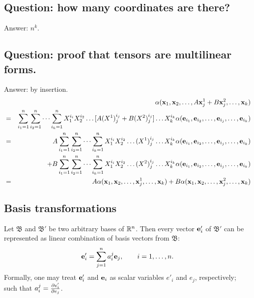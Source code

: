 \subsection*{Question: how many coordinates are there?}
{Answer: $n^k$.}

\subsection*{Question: proof that tensors are multilinear forms.}
{Answer:}
by insertion.
\begin{eqnarray}
&&\alpha ( {\bf x}_1,{\bf x}_2,\ldots , A{\bf x}^1_j+B{\bf x}_j^2,\ldots ,{\bf x}_k)
\nonumber \\
&=&
\sum_{i_1=1}^n
\sum_{i_2=1}^n
\cdots
\sum_{i_k=1}^n
X^{i_i}_1X^{i_2}_2\ldots  [A(X^1)^{i_j}_j+B(X^2)^{i_j}_j]\ldots X^{i_k}_k
\alpha ( {\bf e}_{i_1},{\bf e}_{i_2},\ldots,{\bf e}_{i_j},\ldots ,{\bf e}_{i_k})
\nonumber \\
&=& A
\sum_{i_1=1}^n
\sum_{i_2=1}^n
\cdots
\sum_{i_k=1}^n
X^{i_i}_1X^{i_2}_2\ldots  (X^1)^{i_j}_j\ldots X^{i_k}_k
\alpha ( {\bf e}_{i_1},{\bf e}_{i_2},\ldots,{\bf e}_{i_j},\ldots ,{\bf e}_{i_k})
\nonumber \\
&&\quad +
B
\sum_{i_1=1}^n
\sum_{i_2=1}^n
\cdots
\sum_{i_k=1}^n
X^{i_i}_1X^{i_2}_2\ldots  (X^2)^{i_j}_j\ldots X^{i_k}_k
\alpha ( {\bf e}_{i_1},{\bf e}_{i_2},\ldots,{\bf e}_{i_j},\ldots ,{\bf e}_{i_k})
\nonumber \\
&=& A \alpha ( {\bf x}_1,{\bf x}_2,\ldots , {\bf x}^1_j,\ldots ,{\bf x}_k)+
B \alpha ( {\bf x}_1,{\bf x}_2,\ldots , {\bf x}_j^2,\ldots ,{\bf x}_k)\nonumber
\end{eqnarray}

\subsection{Basis transformations}
Let
${\mathfrak B}$
and
${\mathfrak B'}$
be two arbitrary bases of
${\Bbb R}^n$.
Then every vector ${\bf e}'_i$ of
${\mathfrak B'}$
can be represented as linear combination of basis vectors from
${\mathfrak B}$:
\begin{equation}
{\bf e}'_i=\sum_{j=1}^n a_i^j {\bf e}_j, \qquad i=1,\ldots , n  .
\label{2001-mu-tensors}
\end{equation}
Formally, one may treat  ${\bf e}'_i$ and ${\bf e}_i$
as scalar variables $e'_i$ and $e_j$, respectively; such that
$
a_i^j ={\partial { e}'_i \over \partial { e}_j}
$.


